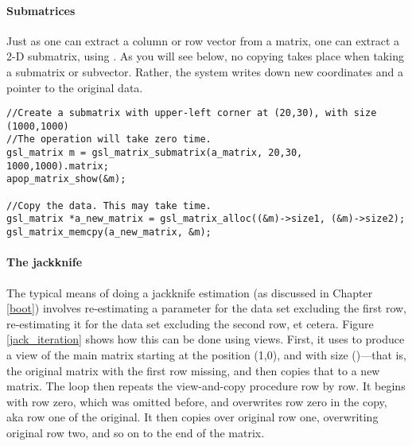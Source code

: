 \paragraph{Submatrices} Just as one can extract a column or row
vector from a matrix, one can extract a 2-D submatrix, using
. As you will see below, no copying takes
place when taking a submatrix or subvector. Rather, the system writes
down new coordinates and a pointer to the original data. 
\begin{lstlisting}
//Create a submatrix with upper-left corner at (20,30), with size (1000,1000)
//The operation will take zero time.
gsl_matrix m = gsl_matrix_submatrix(a_matrix, 20,30, 1000,1000).matrix;
apop_matrix_show(&m);

//Copy the data. This may take time.
gsl_matrix *a_new_matrix = gsl_matrix_alloc((&m)->size1, (&m)->size2);
gsl_matrix_memcpy(a_new_matrix, &m);
\end{lstlisting}

\paragraph{The jackknife}
The typical means of doing a jackknife estimation (as discussed in
Chapter \ref{boot}) involves re-estimating a parameter for the data set
excluding the first row, re-estimating it for the data set excluding the
second row, et cetera.  Figure \ref{jack_iteration}
shows how this can be done using views.  First, it uses
 to produce a view of the main matrix
starting at the position (1,0), and with size ()---that is, the original matrix with the first row missing,
and then copies that to a new matrix. The  loop then repeats
the view-and-copy procedure row by row.  It begins with row zero, which
was omitted before, and overwrites row zero in the copy, aka row one of
the original. It then copies over original row one, overwriting original
row two, and so on to the end of the matrix.


